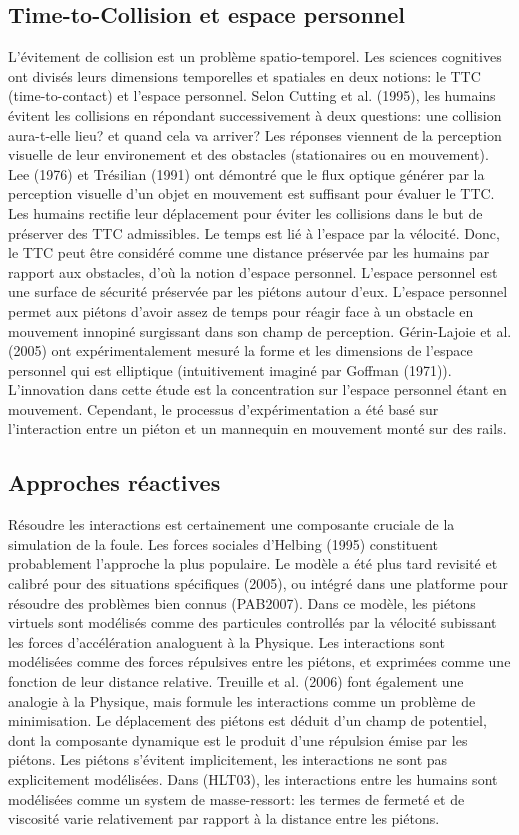 \documentclass[11pt]{article}
\begin{document}
\subsection*{Time-to-Collision et espace personnel}

L'évitement de collision est un problème spatio-temporel. Les sciences cognitives ont divisés leurs dimensions temporelles et spatiales en deux notions: le TTC (time-to-contact) et l'espace personnel. Selon Cutting et al. (1995), les humains évitent les collisions en répondant successivement à deux questions: une collision aura-t-elle  lieu? et quand cela va arriver? Les réponses viennent de la perception visuelle de leur environement et des obstacles (stationaires ou en mouvement). Lee (1976) et Trésilian (1991) ont démontré que le flux optique générer par la perception visuelle d'un objet en mouvement est suffisant pour évaluer le TTC. Les humains rectifie leur déplacement pour éviter les collisions dans le but de préserver des TTC admissibles. Le temps est lié à l'espace par la vélocité. Donc, le TTC peut être considéré comme une distance préservée par les humains par rapport aux obstacles, d'où la notion d'espace personnel. L'espace personnel est une surface de sécurité préservée par les piétons autour d'eux. L'espace personnel permet aux piétons d'avoir assez de temps pour réagir face à un obstacle en mouvement innopiné surgissant dans son champ de perception. Gérin-Lajoie et al. (2005) ont expérimentalement mesuré la forme et les dimensions de l'espace personnel qui est elliptique (intuitivement imaginé par Goffman (1971)). L'innovation dans cette étude est la concentration sur l'espace personnel étant en mouvement. Cependant, le processus d'expérimentation a été basé sur l'interaction entre un piéton et un mannequin en mouvement monté sur des rails.

\subsection*{Approches réactives}

Résoudre les interactions est certainement une composante cruciale de la simulation de la foule. Les forces sociales d'Helbing (1995) constituent probablement l'approche la plus populaire. Le modèle a été plus tard revisité et calibré pour des situations spécifiques (2005), ou intégré dans une platforme pour résoudre des problèmes bien connus (PAB2007). Dans ce modèle, les piétons virtuels sont modélisés comme des particules controllés par la vélocité subissant les forces d'accélération analoguent à la Physique. Les interactions sont modélisées comme des forces répulsives entre les piétons, et exprimées comme une fonction de leur distance relative. Treuille et al. (2006) font également une analogie à la Physique, mais formule les interactions comme un problème de minimisation. Le déplacement des piétons est déduit d'un champ de potentiel, dont la composante dynamique est le produit d'une répulsion émise par les piétons. Les piétons s'évitent implicitement, les interactions ne sont pas explicitement modélisées. Dans (HLT03), les interactions entre les humains sont modélisées comme un system de masse-ressort: les termes de fermeté et de viscosité varie relativement par rapport à la distance entre les piétons.
\end{document}
